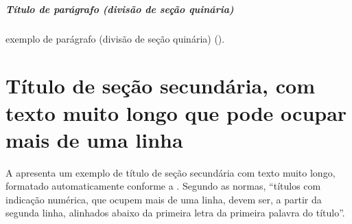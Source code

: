 \subparagraph{Título de parágrafo (divisão de seção quinária)}%
\label{sprgh:lvl-6}

exemplo de parágrafo (divisão de seção quinária) ().

\section{Título de seção secundária, com texto muito longo que pode ocupar mais de uma linha}%
\label{sect:long-title}

A  apresenta um exemplo de título de seção secundária com texto muito longo, formatado automaticamente conforme a \textcites[ 5.2.2 \ppno~10 da  14724]{ABNT2011NBR14724}[ 4.1 \ppno~2 da  6024]{ABNT2012NBR6024}.
Segundo as normas, \enquote{títulos com indicação numérica, que ocupem mais de uma linha, devem ser, a partir da segunda linha, alinhados abaixo da primeira letra da primeira palavra do título}.

% 

% 

% 

% 

% 

% 

% 

% 

% 

% 

% 

% 

% 

% 

% 

% 
